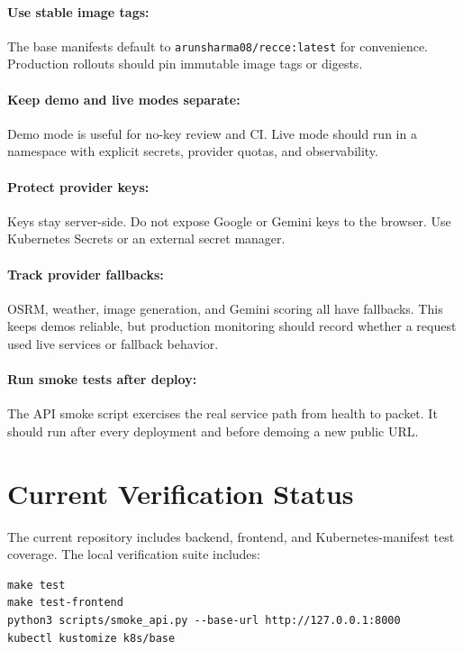 \documentclass[11pt]{article}
\begin{document}
\paragraph{Use stable image tags:}
The base manifests default to \texttt{arunsharma08/recce:latest} for convenience.
Production rollouts should pin immutable image tags or digests.

\paragraph{Keep demo and live modes separate:}
Demo mode is useful for no-key review and CI. Live mode should run in a namespace
with explicit secrets, provider quotas, and observability.

\paragraph{Protect provider keys:}
Keys stay server-side. Do not expose Google or Gemini keys to the browser. Use
Kubernetes Secrets or an external secret manager.

\paragraph{Track provider fallbacks:}
OSRM, weather, image generation, and Gemini scoring all have fallbacks. This
keeps demos reliable, but production monitoring should record whether a request
used live services or fallback behavior.

\paragraph{Run smoke tests after deploy:}
The API smoke script exercises the real service path from health to packet. It
should run after every deployment and before demoing a new public URL.

\section{Current Verification Status}

The current repository includes backend, frontend, and Kubernetes-manifest test
coverage. The local verification suite includes:

\begin{lstlisting}
make test
make test-frontend
python3 scripts/smoke_api.py --base-url http://127.0.0.1:8000
kubectl kustomize k8s/base
\end{lstlisting}
\end{document}
